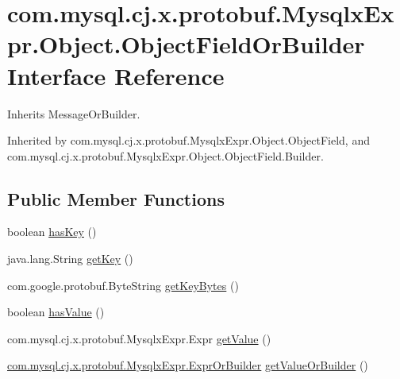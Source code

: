 \hypertarget{interfacecom_1_1mysql_1_1cj_1_1x_1_1protobuf_1_1_mysqlx_expr_1_1_object_1_1_object_field_or_builder}{}\section{com.\+mysql.\+cj.\+x.\+protobuf.\+Mysqlx\+Expr.\+Object.\+Object\+Field\+Or\+Builder Interface Reference}
\label{interfacecom_1_1mysql_1_1cj_1_1x_1_1protobuf_1_1_mysqlx_expr_1_1_object_1_1_object_field_or_builder}


Inherits Message\+Or\+Builder.



Inherited by com.\+mysql.\+cj.\+x.\+protobuf.\+Mysqlx\+Expr.\+Object.\+Object\+Field, and com.\+mysql.\+cj.\+x.\+protobuf.\+Mysqlx\+Expr.\+Object.\+Object\+Field.\+Builder.

\subsection*{Public Member Functions}
\begin{DoxyCompactItemize}
\item 
boolean \mbox{\hyperlink{interfacecom_1_1mysql_1_1cj_1_1x_1_1protobuf_1_1_mysqlx_expr_1_1_object_1_1_object_field_or_builder_ab8ba2a52b8d29621afc32fdd32df15bd}{has\+Key}} ()
\item 
java.\+lang.\+String \mbox{\hyperlink{interfacecom_1_1mysql_1_1cj_1_1x_1_1protobuf_1_1_mysqlx_expr_1_1_object_1_1_object_field_or_builder_aa47a101e08fce765aa00096762d65fd5}{get\+Key}} ()
\item 
com.\+google.\+protobuf.\+Byte\+String \mbox{\hyperlink{interfacecom_1_1mysql_1_1cj_1_1x_1_1protobuf_1_1_mysqlx_expr_1_1_object_1_1_object_field_or_builder_a2820393678c6be77fefafffa63b397fa}{get\+Key\+Bytes}} ()
\item 
boolean \mbox{\hyperlink{interfacecom_1_1mysql_1_1cj_1_1x_1_1protobuf_1_1_mysqlx_expr_1_1_object_1_1_object_field_or_builder_a49305d51b1a1dc6682f3510bd2fb13b1}{has\+Value}} ()
\item 
com.\+mysql.\+cj.\+x.\+protobuf.\+Mysqlx\+Expr.\+Expr \mbox{\hyperlink{interfacecom_1_1mysql_1_1cj_1_1x_1_1protobuf_1_1_mysqlx_expr_1_1_object_1_1_object_field_or_builder_a061a3bc6648cdc5bb2270e34294dd819}{get\+Value}} ()
\item 
\mbox{\hyperlink{interfacecom_1_1mysql_1_1cj_1_1x_1_1protobuf_1_1_mysqlx_expr_1_1_expr_or_builder}{com.\+mysql.\+cj.\+x.\+protobuf.\+Mysqlx\+Expr.\+Expr\+Or\+Builder}} \mbox{\hyperlink{interfacecom_1_1mysql_1_1cj_1_1x_1_1protobuf_1_1_mysqlx_expr_1_1_object_1_1_object_field_or_builder_afcaaef612ea97d2c72cc98283f54606a}{get\+Value\+Or\+Builder}} ()
\end{DoxyCompactItemize}


